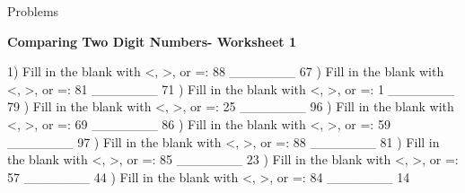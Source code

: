 \documentclass{article}%
\begin{document}
%
\huge%
\vspace*{\fill}%
\begin{center}%
Problems%
\end{center}%
\vspace*{\fill}%
\pagebreak%
\normalsize%
\large%
\begin{center}%
\textbf{Comparing Two Digit Numbers- Worksheet 1}%
\newline%
\newline%
\newline%
\end{center} \normalsize%
1) Fill in the blank with <, >, or =: 88 \_\_\_\_\_\_\_ 67%
\newline%
\newline%
) Fill in the blank with <, >, or =: 81 \_\_\_\_\_\_\_ 71%
\newline%
\newline%
) Fill in the blank with <, >, or =: 1 \_\_\_\_\_\_\_ 79%
\newline%
\newline%
) Fill in the blank with <, >, or =: 25 \_\_\_\_\_\_\_ 96%
\newline%
\newline%
) Fill in the blank with <, >, or =: 69 \_\_\_\_\_\_\_ 86%
\newline%
\newline%
) Fill in the blank with <, >, or =: 59 \_\_\_\_\_\_\_ 97%
\newline%
\newline%
) Fill in the blank with <, >, or =: 88 \_\_\_\_\_\_\_ 81%
\newline%
\newline%
) Fill in the blank with <, >, or =: 85 \_\_\_\_\_\_\_ 23%
\newline%
\newline%
) Fill in the blank with <, >, or =: 57 \_\_\_\_\_\_\_ 44%
\newline%
\newline%
) Fill in the blank with <, >, or =: 84 \_\_\_\_\_\_\_ 14%
\newline%
\newline%
\end{document}
